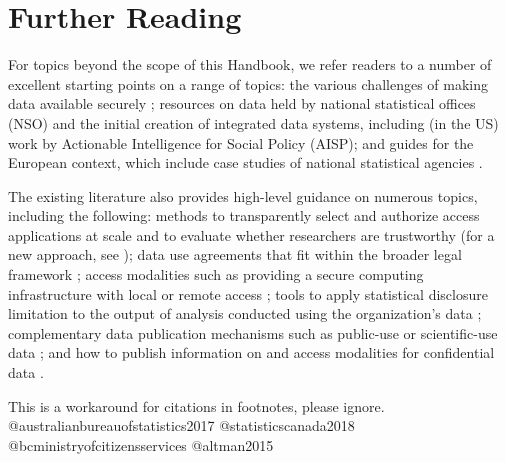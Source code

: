 \hypertarget{further-reading}{%
\section{Further Reading}\label{further-reading}}

For topics beyond the scope of this Handbook, we refer readers to a number of excellent starting points on a range of topics: the various challenges of making data available securely \citep[see f.i.][]{reuter2010, harron2017, adrfnetwork2018, futureofprivacyforum2017}; resources on data held by national statistical offices (NSO) and the initial creation of integrated data systems, including (in the US) work by Actionable Intelligence for Social Policy (AISP); and guides for the European context, which include case studies of national statistical agencies \citep{oecd2014, bujnowska2019}.

The existing literature also provides high-level guidance on numerous topics, including the following: methods to transparently select and authorize access applications at scale and to evaluate whether researchers are trustworthy (for a new approach, see \citet{levenstein2018}); data use agreements that fit within the broader legal framework \citep[some limited guidance provided by][]{kanous2015, kuchinke2016, alter2018}; access modalities such as providing a secure computing infrastructure with local or remote access \citep{weinberg2007, vilhuber2013, vilhuber2017}; tools to apply statistical disclosure limitation to the output of analysis conducted using the organization's data \citep{liu2020, dupriez2010, duncan2011}; complementary data publication mechanisms such as public-use or scientific-use data \citep{bujnowska2019}; and how to publish information on and access modalities for confidential data \citep{abowd2012}.

\begin{invisible}
This is a workaround for citations in footnotes, please ignore.
@australianbureauofstatistics2017 @statisticscanada2018
@bcministryofcitizensservices @altman2015
\end{invisible}

\putbib

